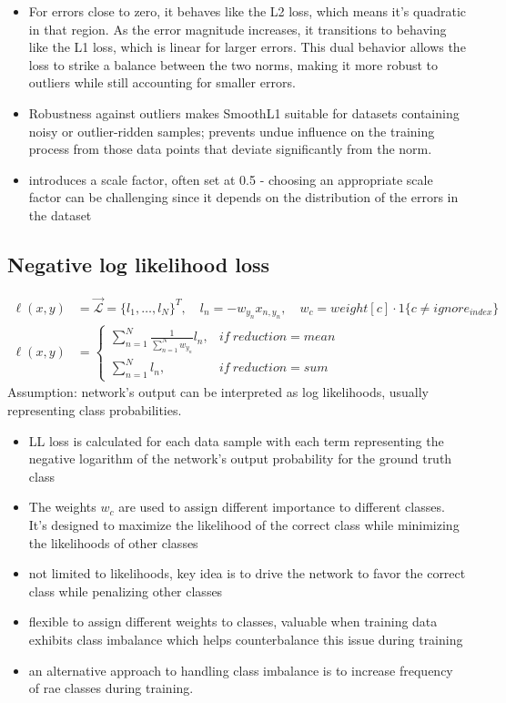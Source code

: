 \documentclass[11pt]{article}
\begin{document}
\begin{itemize}
    \item For errors close to zero, it behaves like the L2 loss, which means it's quadratic in that region. As the error magnitude increases, it transitions to behaving like the L1 loss, which is linear for larger errors. This dual behavior allows the loss to strike a balance between the two norms, making it more robust to outliers while still accounting for smaller errors.
    \item Robustness against outliers makes SmoothL1 suitable for datasets containing noisy or outlier-ridden samples; prevents undue influence on the training process from those data points that deviate significantly from the norm.
    \item introduces a scale factor, often set at 0.5 - choosing an appropriate scale factor can be challenging since it depends on the distribution of the errors in the dataset
\end{itemize}

\subsection{Negative log likelihood loss}

\begin{definition}[Smooth L1]\label{eq:negative-log-likelihood-loss}
    \begin{align*}
        \ell(x,y) & = \vec{\mathcal L} = \{l_1, \ldots, l_N \}^T, \quad l_n = -w_{y_n} x_{n,y_n}, \quad w_c = weight[c] \cdot 1\{c \neq ignore_{index}\} \\
        \ell(x,y) & = \begin{cases}
            \sum^N_{n=1}\frac{1}{\sum^N_{n=1} w_{y_n}} l_n, & if\ reduction = mean \\ 
            \sum^N_{n=1} l_n, & if\ reduction = sum
        \end{cases}
    \end{align*}
    Assumption: network's output can be interpreted as log likelihoods, usually representing class probabilities.
\end{definition}

\begin{itemize}
    \item LL loss is calculated for each data sample  with each term representing the negative logarithm of the network's output probability for the ground truth class
    \item The weights $w_c$ are used to assign different importance to different classes. It's designed to maximize the likelihood of the correct class while minimizing the likelihoods of other classes
    \item not limited to likelihoods, key idea is to drive the network to favor the correct class while penalizing other classes
    \item flexible to assign different weights to classes, valuable when training data exhibits class imbalance which helps counterbalance this issue during training
    \item an alternative approach to handling class imbalance is to increase frequency of rae classes during training.
\end{itemize}
\end{document}
